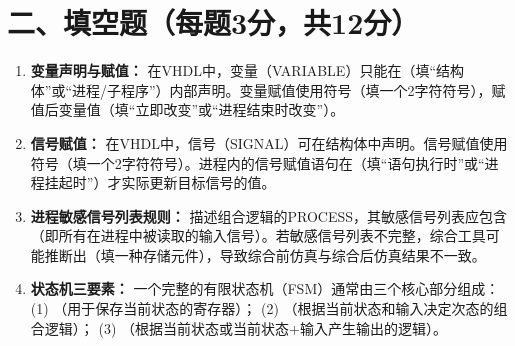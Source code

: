 \newpage

\section*{二、填空题（每题3分，共12分）}

\begin{enumerate}[label=\arabic*.]

\item \textbf{变量声明与赋值：}
在VHDL中，变量（VARIABLE）只能在\underline{\hspace{2.5cm}}（填“结构体”或“进程/子程序”）内部声明。变量赋值使用符号\underline{\hspace{1.5cm}}（填一个2字符符号），赋值后变量值\underline{\hspace{2cm}}（填“立即改变”或“进程结束时改变”）。

\vspace{0.8cm}

\item \textbf{信号赋值：}
在VHDL中，信号（SIGNAL）可在结构体中声明。信号赋值使用符号\underline{\hspace{1.5cm}}（填一个2字符符号）。进程内的信号赋值语句在\underline{\hspace{2.5cm}}（填“语句执行时”或“进程挂起时”）才实际更新目标信号的值。

\vspace{0.8cm}

\item \textbf{进程敏感信号列表规则：}
描述组合逻辑的PROCESS，其敏感信号列表应包含\underline{\hspace{3cm}}（即所有在进程中被读取的输入信号）。若敏感信号列表不完整，综合工具可能推断出\underline{\hspace{2cm}}（填一种存储元件），导致综合前仿真与综合后仿真结果不一致。

\vspace{0.8cm}

\item \textbf{状态机三要素：}
一个完整的有限状态机（FSM）通常由三个核心部分组成：
(1) \underline{\hspace{2.5cm}}（用于保存当前状态的寄存器）；
(2) \underline{\hspace{2.5cm}}（根据当前状态和输入决定次态的组合逻辑）；
(3) \underline{\hspace{2.5cm}}（根据当前状态或当前状态+输入产生输出的逻辑）。

\vspace{0.5cm}

\end{enumerate}

